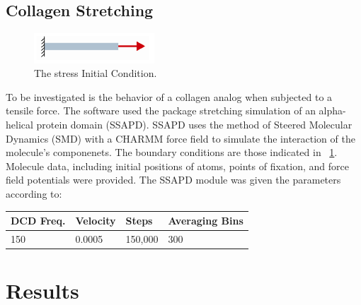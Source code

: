 \documentclass[11pt,twocolumn]{report}
\begin{document}
        \subsection{Collagen Stretching}
        \begin{figure}[!htb]
            \label{fig:applied-stress-partB}
            \centering
            \includegraphics[width=0.4\textwidth]{applied-stress-partB.png}
            \caption{The stress Initial Condition.}
        \end{figure}
        To be investigated is the behavior of a collagen analog when subjected to a tensile force.  The software used the package stretching simulation of an alpha-helical protein domain (SSAPD).  SSAPD uses the method of Steered Molecular Dynamics (SMD) with a CHARMM force field to simulate the interaction of the molecule's componenets.  The boundary conditions are those indicated in ~\ref{fig:applied-stress-partB}.  Molecule data, including initial positions of atoms, points of fixation, and force field potentials were provided.  The SSAPD module was given the parameters according to:
        \begin{tabular}[!htb]{|l|l|l|l|}
            \hline
            DCD Freq. & Velocity & Steps & Averaging Bins \\
            \hline
            150 & 0.0005 & 150,000 & 300 \\
            \hline
        \end{tabular}

    \section{Results}
\end{document}
